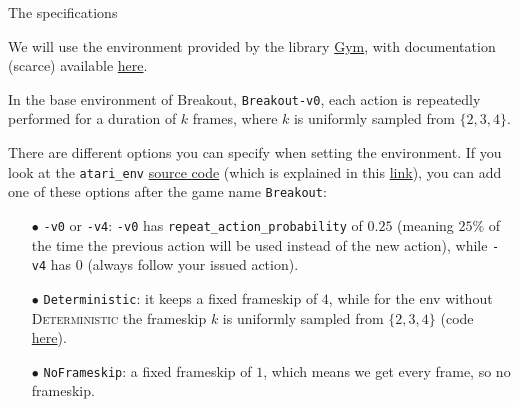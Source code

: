 \documentclass[10pt, aspectratio=169, compress, protectframetitle, handout]{beamer}
\begin{document}
\begin{frame}{The specifications}

    We will use the environment provided by the library \href{https://gym.openai.com/}{Gym}, with documentation (scarce) available \href{https://gym.openai.com/envs/Breakout-v0/}{here}.
    
    
    In the base environment of Breakout, \texttt{Breakout-v0}, each action is repeatedly performed for a duration of $k$ frames, where $k$ is uniformly sampled from $\{2, 3, 4\}$.
    
    There are different options you can specify when setting the environment. If you look at the \texttt{atari\_env} \href{https://github.com/openai/gym/blob/master/gym/envs/__init__.py\#L603}{source code} (which is explained in this \href{https://github.com/openai/gym/issues/1280}{link}), you can add one of these options after the game name \texttt{Breakout}:
    \begin{itemize}
        \item[\alert{$\bullet$}] \texttt{-v0} or \texttt{-v4}: \texttt{-v0} has \texttt{repeat\_action\_probability} of $0.25$ (meaning $25\%$ of the time the previous action will be used instead of the new action), while \texttt{-v4} has $0$ (always follow your issued action).
    
        \item[\alert{$\bullet$}] \texttt{Deterministic}: it keeps a fixed frameskip of $4$, while for the env without \textsc{Deterministic} the frameskip $k$ is uniformly sampled from $\{2, 3, 4\}$ (code \href{https://github.com/openai/gym/blob/master/gym/envs/atari/atari_env.py\#L24}{here}).
        
        \item[\alert{$\bullet$}] \texttt{NoFrameskip}: a fixed frameskip of $1$, which means we get every frame, so no frameskip.
        
    \end{itemize}
    
    

\end{frame}
\end{document}
